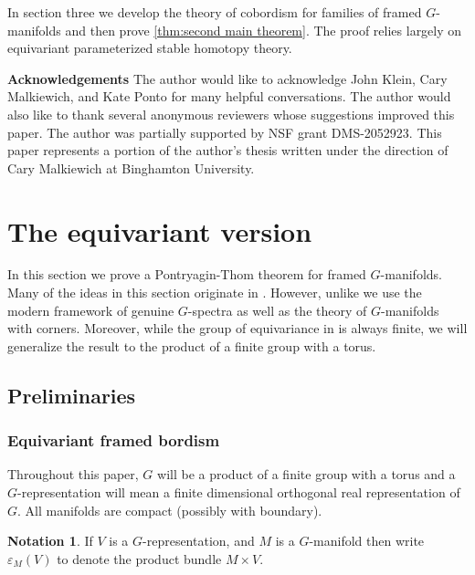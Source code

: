 \documentclass[11pt]{amsart}
\newcommand{\beforesubsection}{\vspace{1em}}
\newcommand{\aftersubsection}{}
\theoremstyle{plain}   %
\theoremstyle{definition}
\newtheorem{notn}[thm]{Notation}
\theoremstyle{remark}
\numberwithin{equation}{section}
\begin{document}
In section three we develop the theory of cobordism for families of framed $G$-manifolds and then prove \cref{thm:second main theorem}. The proof relies largely on equivariant parameterized stable homotopy theory.


\textbf{Acknowledgements}
The author would like to acknowledge John Klein, Cary Malkiewich, and Kate Ponto for many helpful conversations. The author would also like to thank several anonymous reviewers whose suggestions improved this paper. The author was partially supported by NSF grant DMS-2052923. This paper represents a portion of the author's thesis written under the direction of Cary Malkiewich at Binghamton University. 


\section{The equivariant version}\label{sec:Equivariant PT}

In this section we prove a Pontryagin-Thom theorem for framed $G$-manifolds. Many of the ideas in this section originate in \cite{kosniowski_bordism}. However, unlike \cite{kosniowski_bordism} we use the modern framework of genuine $G$-spectra as well as the theory of $G$-manifolds with corners. Moreover, while the group of equivariance in \cite{kosniowski_bordism} is always finite, we will generalize the result to the product of a finite group with a torus. 

\beforesubsection
\subsection{Preliminaries}\aftersubsection

\beforesubsection
\subsubsection{Equivariant framed bordism}\label{subsec:equivariant cobordism}\aftersubsection

Throughout this paper, $G$ will be a product of a finite group with a torus and a $G$-representation will mean a finite dimensional orthogonal real representation of $G$. All manifolds are compact (possibly with boundary).

\begin{notn}
If $V$ is a $G$-representation, and $M$ is a $G$-manifold then write $\varepsilon_M(V)$ to denote the product bundle $M\times V$.  
\end{notn}
\end{document}
